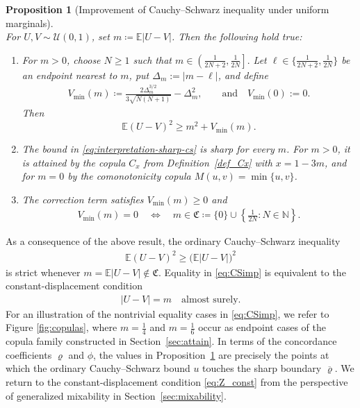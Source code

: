 \documentclass{article}
\newtheorem{proposition}[theorem]{Proposition}
\newcommand{\brho}{\overline\varrho}
\newcommand{\E}{\mathbb{E}}
\newcommand{\N}{\mathbb{N}}
\newcommand{\cU}{\mathcal{U}}
\begin{document}
\begin{proposition}[Improvement of Cauchy--Schwarz inequality under uniform marginals]
\label{prop:sharp-CS}~\\
For \(U,V\sim\cU(0,1)\), set \(m\coloneqq\E|U-V|\).
Then the following hold true:
\begin{enumerate}[label = (\roman*)]
    \item For \(m>0\), choose \(N\geq1\) such that
    \(
        m\in \left(\frac1{2N+2},\frac1{2N}\right].
    \)
    Let \(\ell\in\{\frac1{2N+2},\frac1{2N}\}\) be an endpoint nearest to \(m\), put \(\Delta_m:=|m-\ell|\), and define
    \begin{align}\label{def_Vmin}
        V_{\operatorname{min}}(m)
        \coloneqq
        \frac{2\Delta_m^{3/2}}{3\sqrt{N(N+1)}}-\Delta_m^2, \qquad \text{and} \quad V_{\operatorname{min}}(0):= 0.
    \end{align}
    Then
    \begin{equation}\label{eq:interpretation-sharp-cs}
        \E (U-V)^2
        \geq
        m^2+V_{\operatorname{min}}(m).
    \end{equation}

    \item The bound in \eqref{eq:interpretation-sharp-cs} is sharp for every \(m\).
    For \(m>0\), it is attained by the copula \(C_x\) from Definition~\ref{def_Cx} with \(x=1-3m\), and for \(m=0\) by the comonotonicity copula \(M(u,v)=\min\{u,v\}\).

    \item The correction term satisfies \(V_{\operatorname{min}}(m)\geq 0\) and
    \begin{align}\label{def_centersetC}
        V_{\operatorname{min}}(m)=0
        \quad\Longleftrightarrow\quad
        m\in
        \mathfrak C
        \coloneqq
        \{0\}\cup
        \left\{\frac{1}{2N}\colon N\in\N\right\}.
    \end{align}
\end{enumerate}
\end{proposition}
As a consequence of the above result, the ordinary Cauchy--Schwarz inequality
\begin{align}\label{eq:CSimp}
    \E(U-V)^2\geq \bigl(\E|U-V|\bigr)^2
\end{align}
is strict whenever \(m=\E|U-V|\notin\mathfrak C\).
Equality in \eqref{eq:CSimp} is equivalent to the constant-displacement condition
\begin{align}\label{eq:Z_const}
    |U-V|=m \quad \text{almost surely}.
\end{align}
For an illustration of the nontrivial equality cases in \eqref{eq:CSimp}, we refer to Figure \ref{fig:copulas}, where \(m=\tfrac14\) and \(m=\tfrac16\) occur as endpoint cases of the copula family constructed in Section~\ref{sec:attain}.
In terms of the concordance coefficients \(\varrho\) and \(\phi\), the values in Proposition~\ref{prop:sharp-CS} are precisely the points at which the ordinary Cauchy--Schwarz bound \(u\) touches the sharp boundary \(\brho\).
We return to the constant-displacement condition \eqref{eq:Z_const} from the perspective of generalized mixability in Section~\ref{sec:mixability}.
\end{document}
